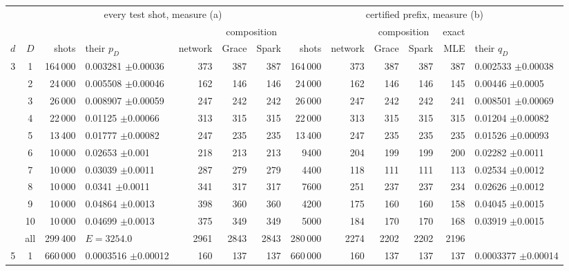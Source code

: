 \begin{tabular}{@{}ccrlrrrrrrrrl@{}}
\toprule
& & \multicolumn{5}{c}{every test shot, measure (a)} & \multicolumn{6}{c}{certified prefix, measure (b)} \\
\cmidrule(lr){3-7}\cmidrule(lr){8-13}
& & & & & \multicolumn{2}{c}{composition} & & & \multicolumn{2}{c}{composition} & exact & \\
\cmidrule(lr){6-7}\cmidrule(lr){10-11}
$d$ & $D$ & shots & their $p_D$ & network & Grace & Spark & shots & network & Grace & Spark & MLE & their $q_D$ \\
\midrule
3 & 1 & 164\,000 & 0.003281 {\tiny$\pm$0.00036} & 373 & 387 & 387 & 164\,000 & 373 & 387 & 387 & 387 & 0.002533 {\tiny$\pm$0.00038} \\
 & 2 & 24\,000 & 0.005508 {\tiny$\pm$0.00046} & 162 & 146 & 146 & 24\,000 & 162 & 146 & 146 & 145 & 0.00446 {\tiny$\pm$0.0005} \\
 & 3 & 26\,000 & 0.008907 {\tiny$\pm$0.00059} & 247 & 242 & 242 & 26\,000 & 247 & 242 & 242 & 241 & 0.008501 {\tiny$\pm$0.00069} \\
 & 4 & 22\,000 & 0.01125 {\tiny$\pm$0.00066} & 313 & 315 & 315 & 22\,000 & 313 & 315 & 315 & 315 & 0.01204 {\tiny$\pm$0.00082} \\
 & 5 & 13\,400 & 0.01777 {\tiny$\pm$0.00082} & 247 & 235 & 235 & 13\,400 & 247 & 235 & 235 & 235 & 0.01526 {\tiny$\pm$0.00093} \\
 & 6 & 10\,000 & 0.02653 {\tiny$\pm$0.001} & 218 & 213 & 213 & 9400 & 204 & 199 & 199 & 200 & 0.02282 {\tiny$\pm$0.0011} \\
 & 7 & 10\,000 & 0.03039 {\tiny$\pm$0.0011} & 287 & 279 & 279 & 4400 & 118 & 111 & 111 & 113 & 0.02534 {\tiny$\pm$0.0012} \\
 & 8 & 10\,000 & 0.0341 {\tiny$\pm$0.0011} & 341 & 317 & 317 & 7600 & 251 & 237 & 237 & 234 & 0.02626 {\tiny$\pm$0.0012} \\
 & 9 & 10\,000 & 0.04864 {\tiny$\pm$0.0013} & 398 & 360 & 360 & 4200 & 175 & 160 & 160 & 158 & 0.04045 {\tiny$\pm$0.0015} \\
 & 10 & 10\,000 & 0.04699 {\tiny$\pm$0.0013} & 375 & 349 & 349 & 5000 & 184 & 170 & 170 & 168 & 0.03919 {\tiny$\pm$0.0015} \\
 & all & 299\,400 & $E=3254.0$ & 2961 & 2843 & 2843 & 280\,000 & 2274 & 2202 & 2202 & 2196 &  \\
\midrule
5 & 1 & 660\,000 & 0.0003516 {\tiny$\pm$0.00012} & 160 & 137 & 137 & 660\,000 & 160 & 137 & 137 & 137 & 0.0003377 {\tiny$\pm$0.00014} \\

\end{tabular}
